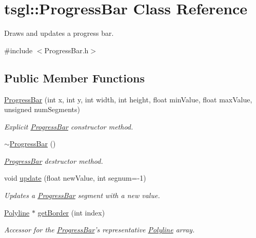 \hypertarget{classtsgl_1_1_progress_bar}{\section{tsgl\-:\-:\-Progress\-Bar \-Class \-Reference}
\label{classtsgl_1_1_progress_bar}
}


\-Draws and updates a progress bar.  




{\ttfamily \#include $<$\-Progress\-Bar.\-h$>$}

\subsection*{\-Public \-Member \-Functions}
\begin{DoxyCompactItemize}
\item 
\hyperlink{classtsgl_1_1_progress_bar_ac79018d09a75c490de3490306146c010}{\-Progress\-Bar} (int x, int y, int width, int height, float min\-Value, float max\-Value, unsigned num\-Segments)
\begin{DoxyCompactList}\small\item\em \-Explicit \hyperlink{classtsgl_1_1_progress_bar}{\-Progress\-Bar} constructor method. \end{DoxyCompactList}\item 
\hyperlink{classtsgl_1_1_progress_bar_aa3ad600db2cbd0e8f9221c264535df21}{$\sim$\-Progress\-Bar} ()
\begin{DoxyCompactList}\small\item\em \hyperlink{classtsgl_1_1_progress_bar}{\-Progress\-Bar} destructor method. \end{DoxyCompactList}\item 
void \hyperlink{classtsgl_1_1_progress_bar_a4274998e4935f33eb9212b2174d9c0c5}{update} (float new\-Value, int segnum=-\/1)
\begin{DoxyCompactList}\small\item\em \-Updates a \hyperlink{classtsgl_1_1_progress_bar}{\-Progress\-Bar} segment with a new value. \end{DoxyCompactList}\item 
\hyperlink{classtsgl_1_1_polyline}{\-Polyline} $\ast$ \hyperlink{classtsgl_1_1_progress_bar_ac2b51bdb0d19afaa03d60a9928fc873f}{get\-Border} (int index)
\begin{DoxyCompactList}\small\item\em \-Accessor for the \hyperlink{classtsgl_1_1_progress_bar}{\-Progress\-Bar}'s representative \hyperlink{classtsgl_1_1_polyline}{\-Polyline} array. \end{DoxyCompactList}\item 

\end{DoxyCompactItemize}
